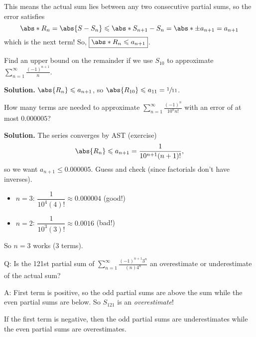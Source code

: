 This means the actual sum lies between any two consecutive partial sums,
so the error satisfies
\[ \abs*{R_n}=\abs{S-S_n}\leqslant \abs*{S_{n+1}-S_n}=\abs*{\pm a_{n+1}}=
    a_{n+1} \]
which is the next term! So, $ \boxed{\abs*{R_n}\leqslant a_{n+1}} $.

\begin{Example}{}{}
    Find an upper bound on the remainder if we use $ S_{10} $ to approximate
    $ \displaystyle \sum\limits_{n=1}^{\infty} \frac{(-1)^{n+1}}{n} $.

    \textbf{Solution.} $ \abs{R_n}\leqslant a_{n+1} $, so $ \abs{R_{10}}\leqslant a_{11}=\sfrac{1}{11} $.
\end{Example}

\begin{Example}{}{}
    How many terms are needed to approximate
    $ \displaystyle  \sum\limits_{n=1}^{\infty} \frac{(-1)^n}{10^n n!} $
    with an error of at most $ 0.000005 $?

    \textbf{Solution.} The series converges by AST (exercise)
    \[ \abs{R_n}\leqslant a_{n+1}=\frac{1}{10^{n+1}(n+1)!}, \]
    so we want $ a_{n+1}\leqslant 0.000005 $. Guess and check
    (since factorials don't have inverses).
    \begin{itemize}
        \item $ n=3 $: $ \dfrac{1}{10^4(4)!}\approx 0.000004 $ (good!)
        \item $ n=2 $: $ \dfrac{1}{10^3(3)!} \approx 0.0016 $ (bad!)
    \end{itemize}
    So $ n=3 $ works (3 terms).
\end{Example}

Q\@: Is the 121st partial sum of
$ \displaystyle  \sum\limits_{n=1}^{\infty} \frac{(-1)^{n+1}3^n}{(n) 4^n} $
an overestimate or underestimate of the actual sum?

A\@: First term is positive, so the odd partial sums are
above the sum while the even partial sums are below. So
$ S_{121} $ is an \emph{overestimate}!

\begin{Remark}{}{}
    If the first term is negative, then the odd partial sums are underestimates
    while the even partial sums are overestimates.
\end{Remark}
